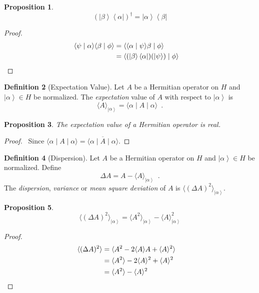 \documentclass{book}
\let\qed\relax
\newtheorem{prop}{Proposition}[chapter]
\theoremstyle{definition}
\newtheorem{df}[prop]{Definition}
\newcommand{\bra}[1]{\ensuremath{\left\langle {#1} \right|}}
\newcommand{\ket}[1]{\ensuremath{\left| {#1} \right\rangle}}
\begin{document}
\begin{prop}
\[ (\ket{\beta} \bra{\alpha})^\dagger = \ket{\alpha} \bra{\beta} \]
\end{prop}

\begin{proof}
\pf
\begin{align*}
\langle \psi \mid \alpha \rangle \langle \beta \mid \phi \rangle
& = \langle \langle \alpha \mid \psi \rangle \beta \mid \phi \rangle \\
& = \langle (\ket{\beta} \bra{\alpha})(\ket{\psi}) \mid \phi \rangle & \qed
\end{align*}
\end{proof}

\begin{df}[Expectation Value]
Let $A$ be a Hermitian operator on $H$ and $\ket{\alpha} \in H$ be normalized. The \emph{expectation} value of $A$ with respect to $\ket{\alpha}$ is
\[ \langle A \rangle_{\ket{\alpha}} = \langle \alpha \mid A \mid \alpha \rangle \enspace . \]
\end{df}

\begin{prop}
The expectation value of a Hermitian operator is real.
\end{prop}

\begin{proof}
\pf\ Since $\langle \alpha \mid A \mid \alpha \rangle = \overline{\langle \alpha \mid A \mid \alpha \rangle}$. \qed
\end{proof}

\begin{df}[Dispersion]
Let $A$ be a Hermitian operator on $H$ and $\ket{\alpha} \in H$ be normalized. Define
\[ \Delta A = A - \langle A \rangle_{\ket{\alpha}} \enspace . \]
The \emph{dispersion}, \emph{variance} or \emph{mean square deviation} of $A$ is $\langle (\Delta A)^2 \rangle_{\ket{\alpha}}$.
\end{df}

\begin{prop}
\[ \langle (\Delta A)^2 \rangle_{\ket{\alpha}} = \langle A^2 \rangle_{\ket{\alpha}} - \langle A \rangle_{\ket{\alpha}}^2 \]
\end{prop}

\begin{proof}
\pf
\begin{align*}
\langle (\Delta A)^2 \rangle & = \langle A^2 - 2 \langle A \rangle A + \langle A \rangle^2 \rangle \\
& = \langle A^2 \rangle - 2 \langle A \rangle^2 + \langle A \rangle^2 \\
& = \langle A^2 \rangle - \langle A \rangle^2 & \qed
\end{align*}
\end{proof}
\end{document}
